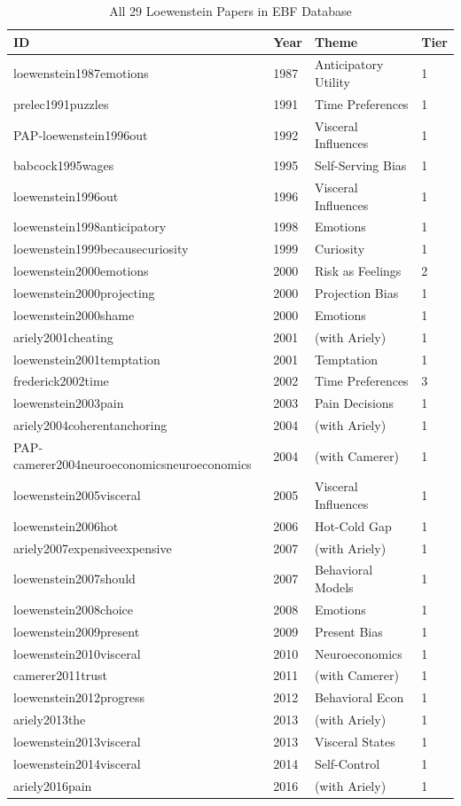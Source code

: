 \begin{table}[htbp]
\centering
\caption{All 29 Loewenstein Papers in EBF Database}
\label{tab:lo-papers}
\renewcommand{\arraystretch}{1.2}
\scriptsize
\begin{tabular}{@{}llll@{}}
\toprule
\textbf{ID} & \textbf{Year} & \textbf{Theme} & \textbf{Tier} \\
\midrule
loewenstein1987emotions & 1987 & Anticipatory Utility & 1 \\
prelec1991puzzles & 1991 & Time Preferences & 1 \\
PAP-loewenstein1996out & 1992 & Visceral Influences & 1 \\
babcock1995wages & 1995 & Self-Serving Bias & 1 \\
loewenstein1996out & 1996 & Visceral Influences & 1 \\
loewenstein1998anticipatory & 1998 & Emotions & 1 \\
loewenstein1999becausecuriosity & 1999 & Curiosity & 1 \\
loewenstein2000emotions & 2000 & Risk as Feelings & 2 \\
loewenstein2000projecting & 2000 & Projection Bias & 1 \\
loewenstein2000shame & 2000 & Emotions & 1 \\
ariely2001cheating & 2001 & (with Ariely) & 1 \\
loewenstein2001temptation & 2001 & Temptation & 1 \\
frederick2002time & 2002 & Time Preferences & 3 \\
loewenstein2003pain & 2003 & Pain Decisions & 1 \\
ariely2004coherentanchoring & 2004 & (with Ariely) & 1 \\
PAP-camerer2004neuroeconomicsneuroeconomics & 2004 & (with Camerer) & 1 \\
loewenstein2005visceral & 2005 & Visceral Influences & 1 \\
loewenstein2006hot & 2006 & Hot-Cold Gap & 1 \\
ariely2007expensiveexpensive & 2007 & (with Ariely) & 1 \\
loewenstein2007should & 2007 & Behavioral Models & 1 \\
loewenstein2008choice & 2008 & Emotions & 1 \\
loewenstein2009present & 2009 & Present Bias & 1 \\
loewenstein2010visceral & 2010 & Neuroeconomics & 1 \\
camerer2011trust & 2011 & (with Camerer) & 1 \\
loewenstein2012progress & 2012 & Behavioral Econ & 1 \\
ariely2013the & 2013 & (with Ariely) & 1 \\
loewenstein2013visceral & 2013 & Visceral States & 1 \\
loewenstein2014visceral & 2014 & Self-Control & 1 \\
ariely2016pain & 2016 & (with Ariely) & 1 \\
\bottomrule
\end{tabular}
\end{table}


